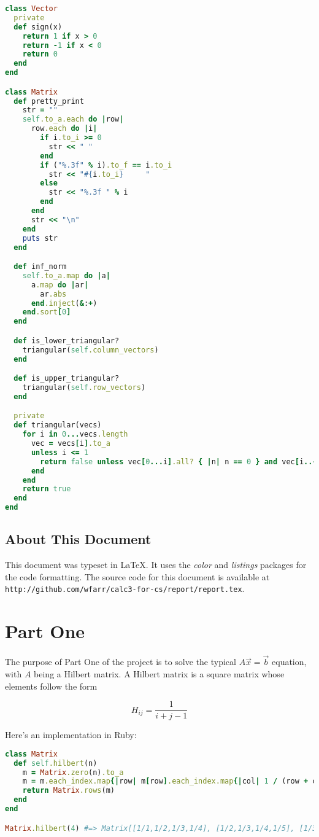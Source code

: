 \documentclass[letterpaper,12pt]{article}
\begin{document}
\lstset{caption=Common Code for All Three Parts}
\begin{lstlisting}[language=ruby]
class Vector
  private
  def sign(x)
    return 1 if x > 0
    return -1 if x < 0
    return 0
  end
end

class Matrix
  def pretty_print
    str = ""
    self.to_a.each do |row|
      row.each do |i|
        if i.to_i >= 0
          str << " "
        end
        if ("%.3f" % i).to_f == i.to_i
          str << "#{i.to_i}     "
        else
          str << "%.3f " % i
        end
      end
      str << "\n"
    end
    puts str
  end

  def inf_norm
    self.to_a.map do |a|
      a.map do |ar|
        ar.abs
      end.inject(&:+)
    end.sort[0]
  end

  def is_lower_triangular?
    triangular(self.column_vectors)
  end

  def is_upper_triangular?
    triangular(self.row_vectors)
  end

  private
  def triangular(vecs)
    for i in 0...vecs.length
      vec = vecs[i].to_a
      unless i <= 1
        return false unless vec[0...i].all? { |n| n == 0 } and vec[i..-1].all? { |n| n != 0 }
      end
    end
    return true
  end
end
\end{lstlisting}

\subsection{About This Document}

This document was typeset in \LaTeX.
It uses the \textit{color} and \textit{listings} packages for the code
formatting.
The source code for this document is available at
\texttt{http://github.com/wfarr/calc3-for-cs/report/report.tex}.

\newpage
\section{Part One}


The purpose of Part One of the project is to solve the typical
$A\vec{x} = \vec{b}$ equation, with $A$ being a Hilbert matrix.
A Hilbert matrix is a square matrix whose elements follow the form

\[H_{ij} = \frac{1}{i + j - 1}\]

Here's an implementation in Ruby:

\lstset{caption=Hilbert Matrix Implementation}
\begin{lstlisting}[language=ruby]
class Matrix
  def self.hilbert(n)
    m = Matrix.zero(n).to_a
    m = m.each_index.map{|row| m[row].each_index.map{|col| 1 / (row + col + 1)}}
    return Matrix.rows(m)
  end
end

Matrix.hilbert(4) #=> Matrix[[1/1,1/2,1/3,1/4], [1/2,1/3,1/4,1/5], [1/3,1/4,1/5,1/6], [1/4,1/5,1/6,1/7]]
\end{lstlisting}
\end{document}
